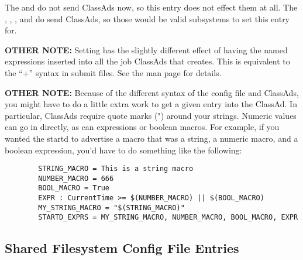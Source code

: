 \begin{description}
  \Note The  and  do not send
  ClassAds now, so this entry does not effect them at all.  The
  , , , and
   do send ClassAds, so those would be valid
  subsystems to set this entry for.
  
  \textbf{OTHER NOTE:} Setting  has the slightly
  different effect of having the named expressions inserted into all
  the job ClassAds that  creates.  This is equivalent
  to the ``+'' syntax in submit files.  See the
   man page for details.  

  \textbf{OTHER NOTE:} Because of the different syntax of the config
  file and ClassAds, you might have to do a little extra work to get a
  given entry into the ClassAd.  In particular, ClassAds require quote
  marks (") around your strings.  Numeric values can go in directly,
  as can expressions or boolean macros.  For example, if you wanted
  the startd to advertise a macro that was a string, a numeric macro,
  and a boolean expression, you'd have to do something like the
  following:

\begin{verbatim}
        STRING_MACRO = This is a string macro
        NUMBER_MACRO = 666
        BOOL_MACRO = True
        EXPR : CurrentTime >= $(NUMBER_MACRO) || $(BOOL_MACRO)
        MY_STRING_MACRO = "$(STRING_MACRO)"
        STARTD_EXPRS = MY_STRING_MACRO, NUMBER_MACRO, BOOL_MACRO, EXPR
\end{verbatim}

\end{description}

\subsection{\label{sec:Shared-Filesystem-Config-File-Entries}
Shared Filesystem Config File Entries}

